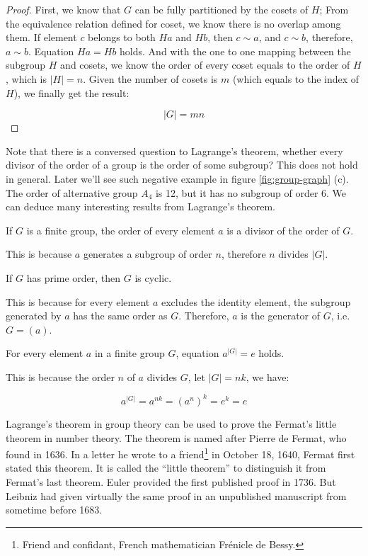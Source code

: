 \documentclass{article}
\begin{document}
\begin{proof}
First, we know that $G$ can be fully partitioned by the cosets of $H$; From the equivalence relation defined for coset, we know there is no overlap among them. If element $c$ belongs to both $Ha$ and $Hb$, then $c \sim a$, and $c \sim b$, therefore, $a \sim b$. Equation $Ha = Hb$ holds. And with the one to one mapping between the subgroup $H$ and cosets, we know the order of every coset equals to the order of $H$, which is $|H| = n$. Given the number of cosets is $m$ (which equals to the index of $H$), we finally get the result:

\[
|G| = mn
\]
\end{proof}

Note that there is a conversed question to Lagrange's theorem, whether every divisor of the order of a group is the order of some subgroup? This does not hold in general. Later we'll see such negative example in figure \ref{fig:group-graph} (c). The order of alternative group $A_4$ is 12, but it has no subgroup of order 6. We can deduce many interesting results from Lagrange's theorem.

\begin{corollary}
If $G$ is a finite group, the order of every element $a$ is a divisor of the order of $G$.
\end{corollary}

This is because $a$ generates a subgroup of order $n$, therefore $n$ divides $|G|$.

\begin{corollary}
If $G$ has prime order, then $G$ is cyclic.
\end{corollary}

This is because for every element $a$ excludes the identity element, the subgroup generated by $a$ has the same order as $G$. Therefore, $a$ is the generator of $G$, i.e. $G = (a)$.

\begin{corollary}
For every element $a$ in a finite group $G$, equation $a^{|G|} = e$ holds.
\label{corollary:Lagrange-elem-order}
\end{corollary}

This is because the order $n$ of $a$ divides $G$, let $|G| = nk$, we have:

\[
a^{|G|} = a^{nk} = (a^n)^k = e^k = e
\]

Lagrange's theorem in group theory can be used to prove the Fermat's little theorem in number theory. The theorem is named after Pierre de Fermat, who found in 1636. In a letter he wrote to a friend\footnote{Friend and confidant, French mathematician Frénicle de Bessy.} in October 18, 1640, Fermat first stated this theorem. It is called the ``little theorem'' to distinguish it from Fermat's last theorem. Euler provided the first published proof in 1736. But Leibniz had given virtually the same proof in an unpublished manuscript from sometime before 1683.
\end{document}
